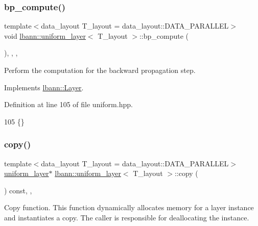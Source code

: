 \subsubsection{\texorpdfstring{bp\+\_\+compute()}{bp\_compute()}}
{\footnotesize\ttfamily template$<$data\+\_\+layout T\+\_\+layout = data\+\_\+layout\+::\+D\+A\+T\+A\+\_\+\+P\+A\+R\+A\+L\+L\+EL$>$ \\
void \hyperlink{classlbann_1_1uniform__layer}{lbann\+::uniform\+\_\+layer}$<$ T\+\_\+layout $>$\+::bp\+\_\+compute (\begin{DoxyParamCaption}{ }\end{DoxyParamCaption})\hspace{0.3cm}{\ttfamily [inline]}, {\ttfamily [override]}, {\ttfamily [protected]}, {\ttfamily [virtual]}}

Perform the computation for the backward propagation step. 

Implements \hyperlink{classlbann_1_1Layer_a7442e01f9ee1294df2de811efcf5171e}{lbann\+::\+Layer}.



Definition at line 105 of file uniform.\+hpp.


\begin{DoxyCode}
105 \{\}
\end{DoxyCode}
\mbox{\label{classlbann_1_1uniform__layer_a3d148d514eaf8524a8ad3ec13ab69d59}} 
\subsubsection{\texorpdfstring{copy()}{copy()}}
{\footnotesize\ttfamily template$<$data\+\_\+layout T\+\_\+layout = data\+\_\+layout\+::\+D\+A\+T\+A\+\_\+\+P\+A\+R\+A\+L\+L\+EL$>$ \\
\hyperlink{classlbann_1_1uniform__layer}{uniform\+\_\+layer}$\ast$ \hyperlink{classlbann_1_1uniform__layer}{lbann\+::uniform\+\_\+layer}$<$ T\+\_\+layout $>$\+::copy (\begin{DoxyParamCaption}{ }\end{DoxyParamCaption}) const\hspace{0.3cm}{\ttfamily [inline]}, {\ttfamily [override]}, {\ttfamily [virtual]}}

Copy function. This function dynamically allocates memory for a layer instance and instantiates a copy. The caller is responsible for deallocating the instance. 

